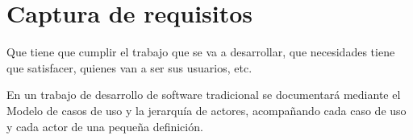 \chapter{Captura de requisitos}
\newpage
Que tiene que cumplir el trabajo que se va a desarrollar, 
que necesidades tiene que satisfacer, quienes van a ser sus usuarios, etc.

En un trabajo de desarrollo de software tradicional se 
documentará mediante el Modelo de casos de uso y la jerarquía 
de actores, acompañando cada caso de uso y cada actor de una pequeña definición.